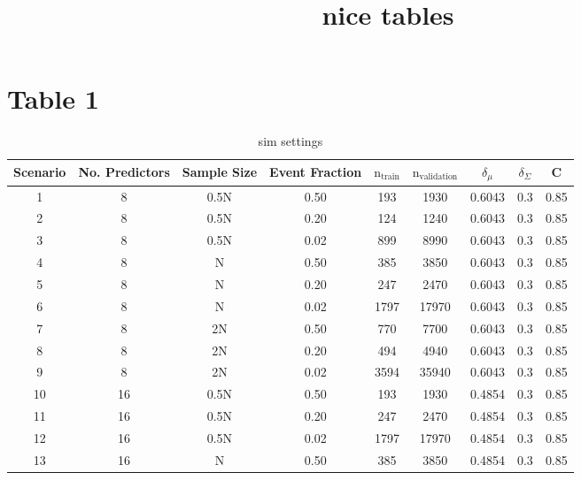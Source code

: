 \documentclass[
]{article}
\title{nice tables}
\author{}
\date{\vspace{-2.5em}}
\begin{document}
\maketitle

\hypertarget{table-1}{%
\section{Table 1}\label{table-1}}

\begin{table}[!h]

\caption{\label{tab:tab:table} sim settings }
\centering
\begin{tabular}[t]{ccccccccc}
\toprule
Scenario & No. Predictors & Sample Size & Event Fraction & $\mathrm{n}_{\mathrm{train}}$ & $\mathrm{n}_{\mathrm{validation}}$ & $\delta_\mu$ & $\delta_\Sigma$ & C\\
\midrule
1 & 8 & 0.5N & 0.50 & 193 & 1930 & 0.6043 & 0.3 & 0.85\\
  
2 & 8 & 0.5N & 0.20 & 124 & 1240 & 0.6043 & 0.3 & 0.85\\
  
3 & 8 & 0.5N & 0.02 & 899 & 8990 & 0.6043 & 0.3 & 0.85\\
  
4 & 8 & N & 0.50 & 385 & 3850 & 0.6043 & 0.3 & 0.85\\
  
5 & 8 & N & 0.20 & 247 & 2470 & 0.6043 & 0.3 & 0.85\\
  
6 & 8 & N & 0.02 & 1797 & 17970 & 0.6043 & 0.3 & 0.85\\
  
7 & 8 & 2N & 0.50 & 770 & 7700 & 0.6043 & 0.3 & 0.85\\
  
8 & 8 & 2N & 0.20 & 494 & 4940 & 0.6043 & 0.3 & 0.85\\
  
9 & 8 & 2N & 0.02 & 3594 & 35940 & 0.6043 & 0.3 & 0.85\\
  
10 & 16 & 0.5N & 0.50 & 193 & 1930 & 0.4854 & 0.3 & 0.85\\
  
11 & 16 & 0.5N & 0.20 & 247 & 2470 & 0.4854 & 0.3 & 0.85\\
  
12 & 16 & 0.5N & 0.02 & 1797 & 17970 & 0.4854 & 0.3 & 0.85\\
  
13 & 16 & N & 0.50 & 385 & 3850 & 0.4854 & 0.3 & 0.85\\
  

\end{tabular}
\end{table}
\end{document}
